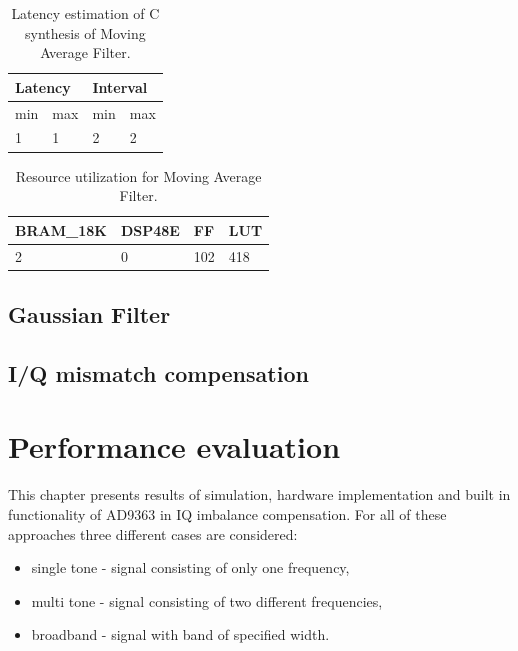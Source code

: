 \documentclass[en,printmode]{mgr}
\begin{document}
	\begin{table}[]
		\centering
		\caption{}
		\begin{tabular}{|l|l|l|l|}
		\hline
		\multicolumn{2}{|l|}{Latency} & \multicolumn{2}{l|}{Interval} \\ \hline
			min           & max           & min           & max           \\ \hline
			1             & 1             & 2             & 2             \\ \hline
		\end{tabular}
		\caption{Latency estimation of C synthesis of Moving Average Filter.}
	\end{table}
	
	\begin{table}[]
		\centering
		\caption{}
		\begin{tabular}{|l|l|l|l|}
		\hline
		BRAM\_18K & DSP48E & FF  & LUT \\ \hline
		2         & 0      & 102 & 418 \\ \hline
		\end{tabular}
		\caption{Resource utilization for Moving Average Filter.}
	\end{table}
	
	\section{Gaussian Filter}
	\section{I/Q mismatch compensation}
	
	
	
\chapter{Performance evaluation}
	This chapter presents results of simulation, hardware implementation and built in
	functionality of AD9363 in IQ imbalance compensation. For all of these approaches
	three different cases are considered:
	\begin{itemize}
		\item single tone - signal consisting of only one frequency,
		\item multi tone - signal consisting of two different frequencies,
		\item broadband - signal with band of specified width.
	\end{itemize}
	\vspace{1cm}
\end{document}
